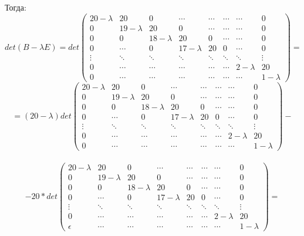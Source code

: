    Тогда:
    \[
    det(B-\lambda E) = 
    det \begin{pmatrix}
    20-\lambda & 20 & 0 &\cdots & \cdots &\cdots & \cdots &0  \\
    0 & 19-\lambda & 20 & 0 & \cdots &\cdots  & \cdots & 0\\
    0 & 0 & 18-\lambda & 20 & 0 &\cdots & \cdots & 0\\
    0 &\cdots& 0 & 17-\lambda & 20 & 0 & \cdots & 0\\
    \vdots & \ddots & \ddots & \ddots & \ddots & \ddots & \ddots & \vdots \\

    0 & \cdots & \cdots & \cdots & \cdots & \cdots & 2-\lambda & 20\\
    
    0 & \cdots & \cdots & \cdots & \cdots & \cdots & \cdots & 1-\lambda
    \end{pmatrix}
    = \]
    \[
    = (20-\lambda) 
    det \begin{pmatrix}
    20-\lambda & 20 & 0 &\cdots & \cdots &\cdots & \cdots &0  \\
    0 & 19-\lambda & 20 & 0 & \cdots &\cdots  & \cdots & 0\\
    0 & 0 & 18-\lambda & 20 & 0 &\cdots & \cdots & 0\\
    0 &\cdots& 0 & 17-\lambda & 20 & 0 & \cdots & 0\\
    \vdots & \ddots & \ddots & \ddots & \ddots & \ddots & \ddots & \vdots \\

    0 & \cdots & \cdots & \cdots & \cdots & \cdots & 2-\lambda & 20\\
    
    0 & \cdots & \cdots & \cdots & \cdots & \cdots & \cdots & 1-\lambda
    \end{pmatrix}
    - \] \\
    \[
    -20 * 
    det \begin{pmatrix}
    20-\lambda & 20 & 0 &\cdots & \cdots &\cdots & \cdots &0  \\
    0 & 19-\lambda & 20 & 0 & \cdots &\cdots  & \cdots & 0\\
    0 & 0 & 18-\lambda & 20 & 0 &\cdots & \cdots & 0\\
    0 &\cdots& 0 & 17-\lambda & 20 & 0 & \cdots & 0\\
    \vdots & \ddots & \ddots & \ddots & \ddots & \ddots & \ddots & \vdots \\

    0 & \cdots & \cdots & \cdots & \cdots & \cdots & 2-\lambda & 20\\
    
    \epsilon & \cdots & \cdots & \cdots & \cdots & \cdots & \cdots & 1-\lambda
    \end{pmatrix} =\]
